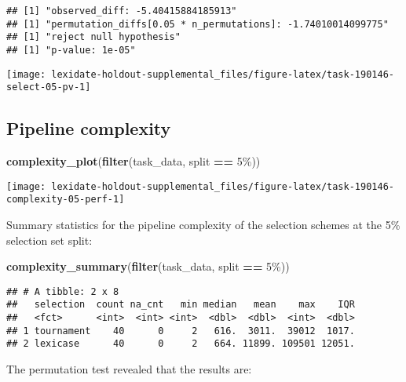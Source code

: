 \documentclass[
]{book}
\newenvironment{Shaded}{\begin{snugshade}}{\end{snugshade}}
\newcommand{\FunctionTok}[1]{\textcolor[rgb]{0.13,0.29,0.53}{\textbf{#1}}}
\newcommand{\NormalTok}[1]{#1}
\newcommand{\SpecialCharTok}[1]{\textcolor[rgb]{0.81,0.36,0.00}{\textbf{#1}}}
\newcommand{\StringTok}[1]{\textcolor[rgb]{0.31,0.60,0.02}{#1}}
\begin{document}
\begin{verbatim}
## [1] "observed_diff: -5.40415884185913"
## [1] "permutation_diffs[0.05 * n_permutations]: -1.74010014099775"
## [1] "reject null hypothesis"
## [1] "p-value: 1e-05"
\end{verbatim}

\texttt{[image: lexidate-holdout-supplemental\_files/figure-latex/task-190146-select-05-pv-1]}

\hypertarget{pipeline-complexity-14}{%
\subsection{Pipeline complexity}\label{pipeline-complexity-14}}

\begin{Shaded}
\begin{Highlighting}[]
\FunctionTok{complexity\_plot}\NormalTok{(}\FunctionTok{filter}\NormalTok{(task\_data, split }\SpecialCharTok{==} \StringTok{\textquotesingle{}5\%\textquotesingle{}}\NormalTok{))}
\end{Highlighting}
\end{Shaded}

\texttt{[image: lexidate-holdout-supplemental\_files/figure-latex/task-190146-complexity-05-perf-1]}

Summary statistics for the pipeline complexity of the selection schemes at the 5\% selection set split:

\begin{Shaded}
\begin{Highlighting}[]
\FunctionTok{complexity\_summary}\NormalTok{(}\FunctionTok{filter}\NormalTok{(task\_data, split }\SpecialCharTok{==} \StringTok{\textquotesingle{}5\%\textquotesingle{}}\NormalTok{))}
\end{Highlighting}
\end{Shaded}

\begin{verbatim}
## # A tibble: 2 x 8
##   selection  count na_cnt   min median   mean    max    IQR
##   <fct>      <int>  <int> <int>  <dbl>  <dbl>  <int>  <dbl>
## 1 tournament    40      0     2   616.  3011.  39012  1017.
## 2 lexicase      40      0     2   664. 11899. 109501 12051.
\end{verbatim}

The permutation test revealed that the results are:
\end{document}
